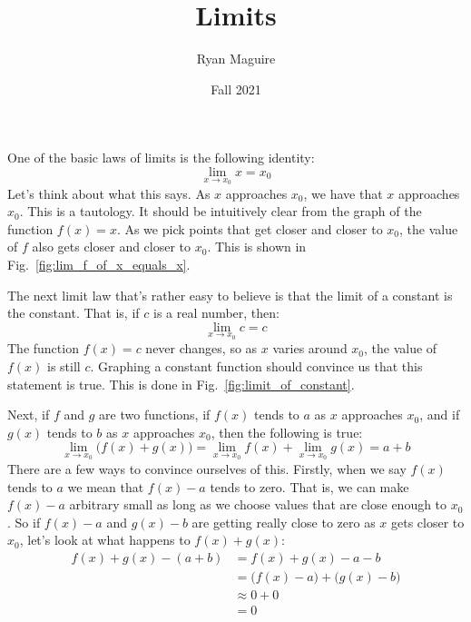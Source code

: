 \documentclass{article}
\title{Limits}
\author{Ryan Maguire}
\date{Fall 2021}
\begin{document}
    \maketitle
    One of the basic laws of limits is the following identity:
    \begin{equation}
        \lim_{x\rightarrow{x_{0}}}x=x_{0}
    \end{equation}
    Let's think about what this says. As $x$ approaches $x_{0}$, we have that
    $x$ approaches $x_{0}$. This is a tautology. It should be intuitively clear
    from the graph of the function $f(x)=x$. As we pick points that get
    closer and closer to $x_{0}$, the value of $f$ also gets closer and closer
    to $x_{0}$. This is shown in Fig.~\ref{fig:lim_f_of_x_equals_x}.
    \par\hfill\par
    The next limit law that's rather easy to believe is that the limit of a
    constant is the constant. That is, if $c$ is a real number, then:
    \begin{equation}
        \lim_{x\rightarrow{x_{0}}}c=c
    \end{equation}
    The function $f(x)=c$ never changes, so as $x$ varies around $x_{0}$,
    the value of $f(x)$ is still $c$. Graphing a constant function should
    convince us that this statement is true. This is done in
    Fig.~\ref{fig:limit_of_constant}.
    \par\hfill\par
    Next, if $f$ and $g$ are two functions, if $f(x)$ tends to $a$ as
    $x$ approaches $x_{0}$, and if $g(x)$ tends to $b$ as $x$ approaches
    $x_{0}$, then the following is true:
    \begin{equation}
        \label{eqn:add_limit_law}%
        \lim_{x\rightarrow{x}_{0}}\big(f(x)+g(x)\big)
        =\lim_{x\rightarrow{x}_{0}}f(x)+
            \lim_{x\rightarrow{x}_{0}}g(x)
        =a+b
    \end{equation}
    There are a few ways to convince ourselves of this. Firstly, when we
    say $f(x)$ tends to $a$ we mean that $f(x)-a$ tends to zero. That is, we
    can make $f(x)-a$ arbitrary small as long as we choose values that are
    close enough to $x_{0}$. So if $f(x)-a$ and $g(x)-b$ are getting really
    close to zero as $x$ gets closer to $x_{0}$, let's look at what happens
    to $f(x)+g(x)$:
    \begin{align}
        f(x)+g(x)-(a+b)&=f(x)+g(x)-a-b\\
        &=\big(f(x)-a\big)+\big(g(x)-b\big)\\
        &\approx{0}+0\\
        &=0
    \end{align}
\end{document}
